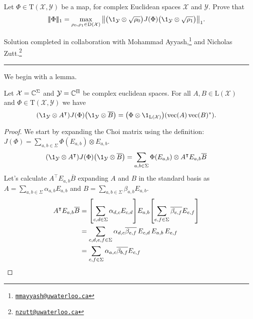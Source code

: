 \documentclass[boxes,pages,color=SeaGreen]{homework}
\newcommand{\collab}[1]{\footnote{\href{mailto:#1}{\texttt{#1}}}}
\renewcommand{\vec}{\operatorname{vec}}
\newcommand{\X}{\mathcal{X}}
\newcommand{\Y}{\mathcal{Y}}
\newcommand{\Lin}{\mathrm{L}}
\newcommand{\Trans}{\mathrm{T}}
\newcommand{\Density}{\mathrm{D}}
\newcommand{\triplenorm}[1]{
  \lvert\!\lvert\!\lvert #1 
  \rvert\!\rvert\!\rvert}
\begin{document}
\begin{problem}
Let $\Phi\in\Trans(\X,\Y)$ be a map, for complex Euclidean spaces $\X$ and
$\Y$.
Prove that
\[
    \triplenorm{\Phi}_1 =
    \max_{\rho_0,\rho_1\in\Density(\X)}
    \norm{
        \qty\big( \1_{\Y} \otimes \sqrt{\rho_0} ) J(\Phi)
        \qty\big( \1_{\Y} \otimes \sqrt{\rho_1} )
    }_1.
\]
\end{problem}

\noindent Solution completed in collaboration with Mohammad Ayyash,\collab{mmayyash@uwaterloo.ca} and Nicholas Zutt.\collab{nzutt@uwaterloo.ca}

{\noindent\color{SeaGreen!30}\rule{\textwidth}{1.5pt}}

\begin{solution}
    We begin with a lemma.
    \begin{lemma}
        Let $\X = \C^\Sigma$ and $\Y = \C^\Pi$ be complex euclidean spaces.
        For all $A, B\in\Lin(\X)$ and $\Phi\in\Trans(\X, \Y)$ we have
        \begin{equation*}
            \qty(\1_\Y\otimes A^\intercal)J(\Phi)\qty(\1_\Y\otimes\overline{B}) = \qty(\Phi\otimes\1_{\Lin(\X)})(\vec(A)\vec(B)^*).
        \end{equation*}
    \end{lemma}
    \begin{proof}
        We start by expanding the Choi matrix using the definition: $J(\Phi) = \sum_{a,b\in\Sigma}\Phi(E_{a,b})\otimes E_{a,b}$.
        \begin{equation*}
            \qty(\1_\Y\otimes A^\intercal)J(\Phi)\qty(\1_\Y\otimes\overline{B}) = \sum_{a,b\in\Sigma}\Phi(E_{a,b})\otimes A^\intercal E_{a,b}\overline{B}
        \end{equation*}
        Let's calculate $A^\intercal E_{a,b}\overline{B}$ expanding $A$ and $B$ in the standard basis as $A = \sum_{a,b\in\Sigma}\alpha_{a,b}E_{a,b}$ and $B = \sum_{a,b\in\Sigma}\beta_{a,b}E_{a,b}$.
        \begin{align*}
            A^\intercal E_{a,b}\overline{B} & = \qty[\sum_{c,d\in\Sigma}\alpha_{d,c}E_{c,d}]E_{a,b}\qty[\sum_{e,f\in\Sigma}\overline{\beta_{e,f}}E_{e,f}] \\
                                            & = \sum_{c,d,e,f\in\Sigma}\alpha_{d,c}\overline{\beta_{e,f}}\,E_{c,d}\,E_{a,b}\,E_{e,f}                      \\
                                            & = \sum_{c,f\in\Sigma}\alpha_{a,c}\overline{\beta_{b,f}}E_{c,f}
        \end{align*}

\end{proof}
\end{solution}
\end{document}
